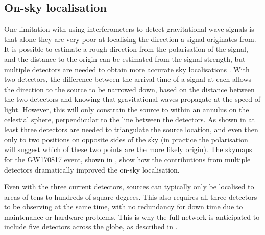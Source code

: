 \subsection{On-sky localisation}
\label{sec:gw_localisation}
\begin{colsection}

One limitation with using interferometers to detect gravitational-wave signals is that alone they are very poor at localising the direction a signal originates from. It is possible to estimate a rough direction from the polarisation of the signal, and the distance to the origin can be estimated from the signal strength, but multiple detectors are needed to obtain more accurate sky localisations \citep{GW_localisation, GW_localisation2}. With two detectors, the difference between the arrival time of a signal at each allows the direction to the source to be narrowed down, based on the distance between the two detectors and knowing that gravitational waves propagate at the speed of light. However, this will only constrain the source to within an annulus on the celestial sphere, perpendicular to the line between the detectors. As shown in  at least three detectors are needed to triangulate the source location, and even then only to two positions on opposite sides of the sky (in practice the polarisation will suggest which of these two points are the more likely origin). The skymaps for the GW170817 event, shown in , show how the contributions from multiple detectors dramatically improved the on-sky localisation.

Even with the three current detectors, sources can typically only be localised to areas of tens to hundreds of square degrees. This also requires all three detectors to be observing at the same time, with no redundancy for down time due to maintenance or hardware problems. This is why the full network is anticipated to include five detectors across the globe, as described in .


\end{colsection}
